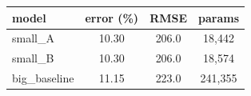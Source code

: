 \begin{tabular}{lccc}
\hline
model & error (\%) & RMSE & params \\
\hline
small\_A      & 10.30 & 206.0 & 18{,}442 \\
small\_B      & 10.30 & 206.0 & 18{,}574 \\
big\_baseline & 11.15 & 223.0 & 241{,}355 \\
\hline
\end{tabular}
